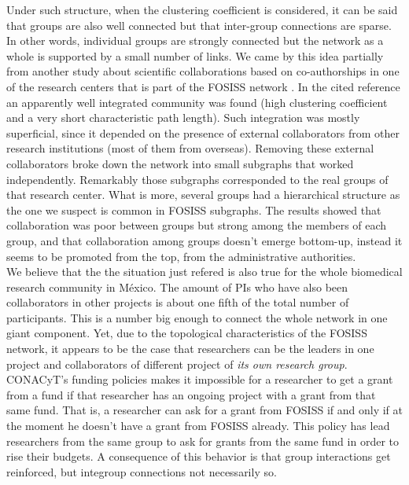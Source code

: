 \documentclass[11pt]{article}
\begin{document}
{{\color{red}Under such structure, when the clustering coefficient is considered, it can be said that groups are also well connected
but that inter-group connections are sparse. In other words, individual groups are strongly connected but the network
as a whole is supported by a small number of links. We came by this idea partially from
another study about scientific collaborations based on co-authorships in one of
the research centers that is part 
of the FOSISS network \cite{HernandezLemus2013}. In the cited reference an apparently well integrated community was
found (high clustering coefficient and a very short characteristic path length). Such integration was mostly
superficial, since it depended on the presence of external collaborators from other research institutions (most of them from overseas). 
Removing these external collaborators broke down the network into small subgraphs that worked independently. Remarkably those subgraphs corresponded to the real
groups of that research center.  What is more, several groups had a hierarchical structure as 
the one we suspect is common in FOSISS subgraphs. The results showed that collaboration was poor between groups but strong
among the members of each group, and that collaboration among groups doesn't emerge bottom-up, instead it seems to be promoted from the
top, from the administrative authorities.}\\ 

{\color{red}We believe that the the situation just refered is also true for the whole biomedical research community in M\'exico. The
amount of PIs who have also been collaborators in other projects is about one fifth of the total number of participants.
This is a number big enough to connect the whole network in one giant component. Yet, due to the topological
characteristics of the FOSISS network, it appears to be the case that researchers can be the leaders in one project and
collaborators of different project of \emph{its own research group}. CONACyT's funding policies makes it impossible for a
researcher to get a grant from a fund if that researcher has an ongoing project with a grant from that same fund. That
is, a researcher can ask for a grant from FOSISS if and only if at the moment he
doesn't have a grant from FOSISS already. This
policy has lead researchers from the same group to ask for grants from the same fund in order to rise their
budgets. A consequence of this behavior is that group interactions get reinforced, but integroup connections not necessarily so.}\\

}
\end{document}
